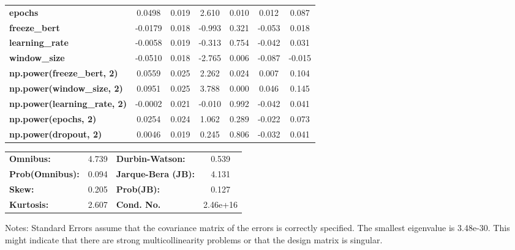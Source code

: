 \begin{center}
\begin{tabular}{lcccccc}
\textbf{epochs}                            &       0.0498  &        0.019     &     2.610  &         0.010        &        0.012    &        0.087     \\
\textbf{freeze\_bert}                      &      -0.0179  &        0.018     &    -0.993  &         0.321        &       -0.053    &        0.018     \\
\textbf{learning\_rate}                    &      -0.0058  &        0.019     &    -0.313  &         0.754        &       -0.042    &        0.031     \\
\textbf{window\_size}                      &      -0.0510  &        0.018     &    -2.765  &         0.006        &       -0.087    &       -0.015     \\
\textbf{np.power(freeze\_bert, 2)}         &       0.0559  &        0.025     &     2.262  &         0.024        &        0.007    &        0.104     \\
\textbf{np.power(window\_size, 2)}         &       0.0951  &        0.025     &     3.788  &         0.000        &        0.046    &        0.145     \\
\textbf{np.power(learning\_rate, 2)}       &      -0.0002  &        0.021     &    -0.010  &         0.992        &       -0.042    &        0.041     \\
\textbf{np.power(epochs, 2)}               &       0.0254  &        0.024     &     1.062  &         0.289        &       -0.022    &        0.073     \\
\textbf{np.power(dropout, 2)}              &       0.0046  &        0.019     &     0.245  &         0.806        &       -0.032    &        0.041     \\
\bottomrule
\end{tabular}
\begin{tabular}{lclc}
\textbf{Omnibus:}       &  4.739 & \textbf{  Durbin-Watson:     } &    0.539  \\
\textbf{Prob(Omnibus):} &  0.094 & \textbf{  Jarque-Bera (JB):  } &    4.131  \\
\textbf{Skew:}          &  0.205 & \textbf{  Prob(JB):          } &    0.127  \\
\textbf{Kurtosis:}      &  2.607 & \textbf{  Cond. No.          } & 2.46e+16  \\
\bottomrule
\end{tabular}
\end{center}

Notes: \newline
 [1] Standard Errors assume that the covariance matrix of the errors is correctly specified. \newline
 [2] The smallest eigenvalue is 3.48e-30. This might indicate that there are \newline
 strong multicollinearity problems or that the design matrix is singular.